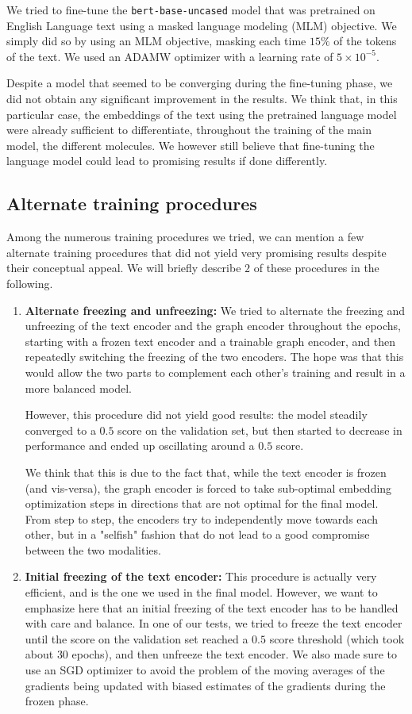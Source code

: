 \documentclass[switch, 12pt]{article}
\begin{document}
\begin{multicols}{2}
    We tried to fine-tune the \texttt{bert-base-uncased} model that was pretrained on English Language text using a masked language modeling (MLM) objective. We simply did so by using an MLM objective, masking each time $15\%$ of the tokens of the text. We used an ADAMW optimizer with a learning rate of $5\times 10^{-5}$.

    Despite a model that seemed to be converging during the fine-tuning phase, we did not obtain any significant improvement in the results. We think that, in this particular case, the embeddings of the text using the pretrained language model were already sufficient to differentiate, throughout the training of the main model, the different molecules. We however still believe that fine-tuning the language model could lead to promising results if done differently.
    \subsection{Alternate training procedures}
    Among the numerous training procedures we tried, we can mention a few alternate training procedures that did not yield very promising results despite their conceptual appeal. We will briefly describe $2$ of these procedures in the following.
    \begin{enumerate}
        \item \textbf{Alternate freezing and unfreezing: } We tried to alternate the freezing and unfreezing of the text encoder and the graph encoder throughout the epochs, starting with a frozen text encoder and a trainable graph encoder, and then repeatedly switching the freezing of the two encoders. The hope was that this would allow the two parts to complement each other's training and result in a more balanced model.

              However, this procedure did not yield good results: the model steadily converged to a $0.5$ score on the validation set, but then started to decrease in performance and ended up oscillating around a $0.5$ score.

              We think that this is due to the fact that, while the text encoder is frozen (and vis-versa), the graph encoder is forced to take sub-optimal embedding optimization steps in directions that are not optimal for the final model. From step to step, the encoders try to independently move towards each other, but in a "selfish" fashion that do not lead to a good compromise between the two modalities.
        \item \textbf{Initial freezing of the text encoder: } This procedure is actually very efficient, and is the one we used in the final model. However, we want to emphasize here that an initial freezing of the text encoder has to be handled with care and balance. In one of our tests, we tried to freeze the text encoder until the score on the validation set reached a $0.5$ score threshold (which took about $30$ epochs), and then unfreeze the text encoder. We also made sure to use an SGD optimizer to avoid the problem of the moving averages of the gradients being updated with biased estimates of the gradients during the frozen phase.


\end{enumerate}
\end{multicols}
\end{document}
